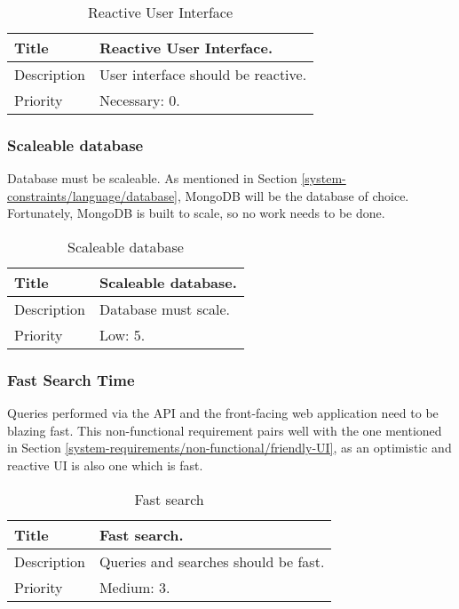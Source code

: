   \begin{table}[h!]
    \caption{Reactive User Interface}
    \label{system-requirements/non-functional/reactive-UI-table}
    \begin{tabularx}{\textwidth}{|l|X|}
      \hline
      Title           & Reactive User Interface. \\ \hline
      Description     & User interface should be reactive.\\ \hline
      Priority        & Necessary: 0. \\ \hline
    \end{tabularx}
  \end{table}

\subsubsection{Scaleable database}
  Database must be scaleable. As mentioned in Section
  \ref{system-constraints/language/database}, MongoDB will be the database of
  choice. Fortunately, MongoDB is built to scale, so no work needs to be done.

  \begin{table}[h!]
    \caption{Scaleable database}
    \label{system-requirements/non-functional/scaleable-database-table}
    \begin{tabularx}{\textwidth}{|l|X|}
      \hline
      Title           & Scaleable database. \\ \hline
      Description     & Database must scale.\\ \hline
      Priority        & Low: 5. \\ \hline
    \end{tabularx}
  \end{table}

\subsubsection{Fast Search Time}
  Queries performed via the API and the front-facing web application need to be
  blazing fast. This non-functional requirement pairs well with the one
  mentioned in Section \ref{system-requirements/non-functional/friendly-UI}, as
  an optimistic and reactive UI is also one which is fast.

  \begin{table}[h!]
    \caption{Fast search}
    \label{system-requirements/non-functional/fast-search}
    \begin{tabularx}{\textwidth}{|l|X|}
      \hline
      Title           & Fast search. \\ \hline
      Description     & Queries and searches should be fast.\\ \hline
      Priority        & Medium: 3. \\ \hline
    \end{tabularx}
  \end{table}
